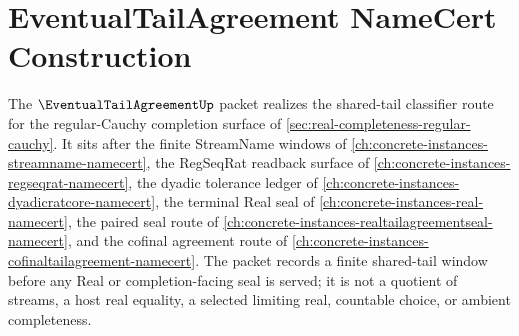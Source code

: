 \chapter{EventualTailAgreement NameCert Construction}
\label{ch:concrete-instances-eventualtailagreement-namecert}

The $\EventualTailAgreementUp$ packet realizes the shared-tail classifier route for the regular-Cauchy completion surface of \autoref{sec:real-completeness-regular-cauchy}. It sits after the finite StreamName windows of \autoref{ch:concrete-instances-streamname-namecert}, the RegSeqRat readback surface of \autoref{ch:concrete-instances-regseqrat-namecert}, the dyadic tolerance ledger of \autoref{ch:concrete-instances-dyadicratcore-namecert}, the terminal Real seal of \autoref{ch:concrete-instances-real-namecert}, the paired seal route of \autoref{ch:concrete-instances-realtailagreementseal-namecert}, and the cofinal agreement route of \autoref{ch:concrete-instances-cofinaltailagreement-namecert}. The packet records a finite shared-tail window before any Real or completion-facing seal is served; it is not a quotient of streams, a host real equality, a selected limiting real, countable choice, or ambient completeness.



